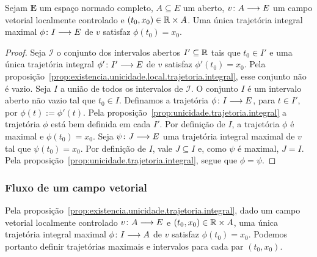 \begin{proposition}
\label{prop:existencia.unicidade.trajetoria.integral}
Sejam $\bm E$ um espaço normado completo, $A \subseteq E$ um aberto, $v\colon \allowbreak A \longrightarrow E$ um campo vetorial localmente controlado e $(t_0, x_0) \in \mathbb{R} \times A$. Uma única trajetória integral maximal $\phi\colon \allowbreak I \longrightarrow E$ de $v$ satisfaz $\phi(t_0) = x_0$.
\end{proposition}
\begin{proof}
Seja $\mathcal I$ o conjunto dos intervalos abertos $I' \subseteq \mathbb{R}$ tais que $t_0 \in I'$ e uma única trajetória integral $\phi'\colon \allowbreak I' \longrightarrow E$ de $v$ satisfaz $\phi'(t_0) = x_0$. Pela proposição~\ref{prop:existencia.unicidade.local.trajetoria.integral}, esse conjunto não é vazio. Seja $I$ a união de todos os intervalos de $\mathcal I$. O conjunto $I$ é um intervalo aberto não vazio tal que $t_0 \in I$. Definamos a trajetória $\phi\colon \allowbreak I \longrightarrow E$, para $t \in I'$, por $\phi(t) := \phi'(t)$. Pela proposição~\ref{prop:unicidade.trajetoria.integral} a trajetória $\phi$ está bem definida em cada $I'$. Por definição de $I$, a trajetória $\phi$ é maximal e $\phi(t_0) = x_0$. Seja $\psi\colon \allowbreak J \longrightarrow E$ uma trajetória integral maximal de $v$ tal que $\psi(t_0) = x_0$. Por definição de $I$, vale $J \subseteq I$ e, como $\psi$ é maximal, $J = I$. Pela proposição~\ref{prop:unicidade.trajetoria.integral}, segue que $\phi = \psi$.
\end{proof}


\subsubsection{Fluxo de um campo vetorial}

Pela proposição~\ref{prop:existencia.unicidade.trajetoria.integral}, dado um campo vetorial localmente controlado $v\colon \allowbreak A \longrightarrow E$ e $(t_0, x_0) \in \mathbb{R} \times A$, uma única trajetória integral maximal $\phi\colon \allowbreak I \longrightarrow A$ de $v$ satisfaz $\phi(t_0) = x_0$. Podemos portanto definir trajetórias maximais e intervalos para cada par $(t_0, x_0)$.

